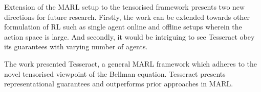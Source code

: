 \documentclass[12pt,letterpaper]{article}
\begin{document}
Extension of the MARL setup to the tensorised framework presents two new directions for future research. Firstly, the work can be extended towards other formulation of RL such as single agent online and offline setups wherein the action space is large. And secondly, it would be intriguing to see Tesseract obey its guarantees with varying number of agents. 

The work presented Tesseract, a general MARL framework which adheres to the novel tensorised viewpoint of the Bellman equation. Tesseract presents representational guarantees and outperforms prior approaches in MARL.
\end{document}
